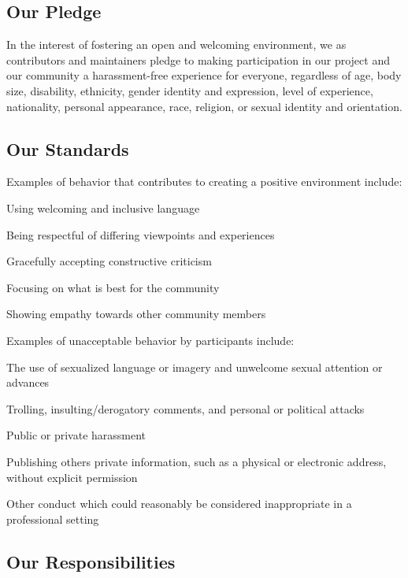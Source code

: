 \subsection*{Our Pledge}

In the interest of fostering an open and welcoming environment, we as contributors and maintainers pledge to making participation in our project and our community a harassment-\/free experience for everyone, regardless of age, body size, disability, ethnicity, gender identity and expression, level of experience, nationality, personal appearance, race, religion, or sexual identity and orientation.

\subsection*{Our Standards}

Examples of behavior that contributes to creating a positive environment include\+:


\begin{DoxyItemize}
\item Using welcoming and inclusive language
\item Being respectful of differing viewpoints and experiences
\item Gracefully accepting constructive criticism
\item Focusing on what is best for the community
\item Showing empathy towards other community members
\end{DoxyItemize}

Examples of unacceptable behavior by participants include\+:


\begin{DoxyItemize}
\item The use of sexualized language or imagery and unwelcome sexual attention or advances
\item Trolling, insulting/derogatory comments, and personal or political attacks
\item Public or private harassment
\item Publishing others\textquotesingle{} private information, such as a physical or electronic address, without explicit permission
\item Other conduct which could reasonably be considered inappropriate in a professional setting
\end{DoxyItemize}

\subsection*{Our Responsibilities}

